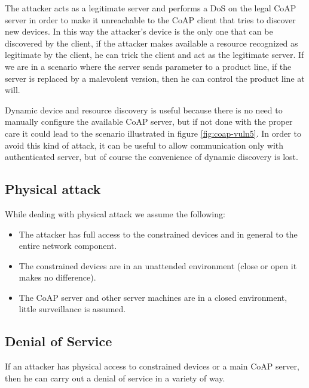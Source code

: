 	The attacker acts as a legitimate server and performs a DoS on the legal CoAP server in order to make it unreachable to the CoAP client that tries to discover new devices.\newline
	In this way the attacker's device is the only one that can be discovered by the client, if the attacker makes available a resource recognized as legitimate by the client, he can trick the client and act as the legitimate server.\newline
	If we are in a scenario where the server sends parameter to a product line, if the server is replaced by a malevolent version, then he can control the product line at will.\newline
	
	Dynamic device and resource discovery is useful because there is no need to manually configure the available CoAP server, but if not done with the proper care it could lead to the scenario illustrated in figure \ref{fig:coap-vuln5}.
	In order to avoid this kind of attack, it can be useful to allow communication only with authenticated server, but of course the convenience of dynamic discovery is lost.\newline
		

	\subsection{Physical attack}
	While dealing with physical attack we assume the following:
	\begin{itemize}
		\item The attacker has full access to the constrained devices and in general to the entire network component.
		\item The constrained devices are in an unattended environment (close or open it makes no difference).
		\item The CoAP server and other server machines are in a closed environment, little surveillance is assumed.
	\end{itemize}
	
	\subsection{Denial of Service}
	If an attacker has physical access to constrained devices or a main CoAP server, then he can carry out a denial of service in a variety of way.\newline
	
